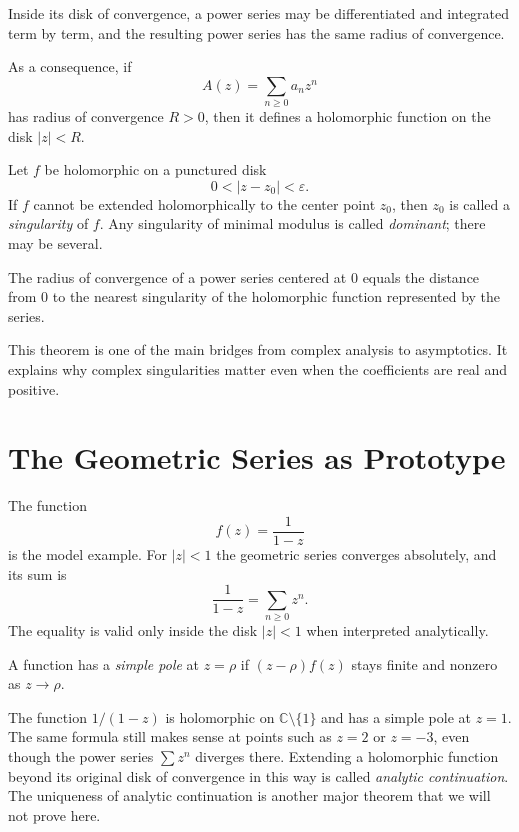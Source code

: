 \begin{theorem}
Inside its disk of convergence, a power series may be differentiated and integrated term by term, and the resulting power series has the same radius of convergence.
\end{theorem}

As a consequence, if
\[
  A(z) = \sum_{n \ge 0} a_n z^n
\]
has radius of convergence $R>0$, then it defines a holomorphic function on the disk $|z|<R$.

\begin{definition}
Let $f$ be holomorphic on a punctured disk
\[
  0 < |z-z_0| < \varepsilon.
\]
If $f$ cannot be extended holomorphically to the center point $z_0$, then $z_0$ is called a \emph{singularity} of $f$.
Any singularity of minimal modulus is called \emph{dominant}; there may be several.
\end{definition}

\begin{theorem}
The radius of convergence of a power series centered at $0$ equals the distance from $0$ to the nearest singularity of the holomorphic function represented by the series.
\end{theorem}

This theorem is one of the main bridges from complex analysis to asymptotics. It explains why complex singularities matter even when the coefficients are real and positive.

\section{The Geometric Series as Prototype}

The function
\[
  f(z) = \frac{1}{1-z}
\]
is the model example. For $|z|<1$ the geometric series converges absolutely, and its sum is
\[
  \frac{1}{1-z} = \sum_{n \ge 0} z^n.
\]
The equality is valid only inside the disk $|z|<1$ when interpreted analytically.

\begin{definition}
A function has a \emph{simple pole} at $z=\rho$ if $(z-\rho)f(z)$ stays finite and nonzero as $z \to \rho$.
\end{definition}

The function $1/(1-z)$ is holomorphic on $\mathbb{C}\setminus\{1\}$ and has a simple pole at $z=1$. The same formula still makes sense at points such as $z=2$ or $z=-3$, even though the power series $\sum z^n$ diverges there. Extending a holomorphic function beyond its original disk of convergence in this way is called \emph{analytic continuation}. The uniqueness of analytic continuation is another major theorem that we will not prove here.

